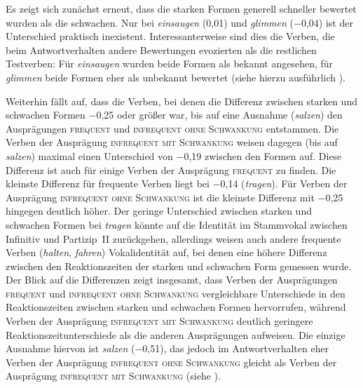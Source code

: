 Es zeigt sich zunächst erneut, dass die starken Formen generell schneller bewertet wurden als die schwachen. Nur bei \textit{einsaugen} (0,01) und \textit{glimmen} (−0,04) ist der Unterschied praktisch inexistent. Interessanterweise sind dies die Verben, die beim Antwortverhalten andere Bewertungen evozierten als die restlichen Testverben: Für \textit{einsaugen} wurden beide Formen als bekannt angesehen, für \textit{glimmen} beide Formen eher als unbekannt bewertet (siehe hierzu ausführlich ).


Weiterhin fällt auf, dass die Verben, bei denen die Differenz zwischen starken und schwachen Formen −0,25 oder größer war, bis auf eine Ausnahme (\textit{salzen}) den Ausprägungen \textsc{frequent} und \textsc{infrequent ohne Schwankung} entstammen. Die Verben der Ausprägung \textsc{infrequent mit Schwankung} weisen dagegen (bis auf \textit{salzen}) maximal einen Unterschied von −0,19 zwischen den Formen auf. Diese Differenz ist auch für einige  Verben der Ausprägung \textsc{frequent} zu finden. Die kleinste Differenz für frequente Verben liegt bei −0,14 (\textit{tragen}). Für Verben der Ausprägung \textsc{infrequent ohne Schwankung} ist die kleinste Differenz  mit −0,25 hingegen deutlich höher. Der geringe Unterschied zwischen starken und schwachen Formen bei \textit{tragen} könnte auf die Identität im Stammvokal zwischen Infinitiv und Partizip~II zurückgehen, allerdings weisen auch andere frequente Verben (\textit{halten}, \textit{fahren}) Vokalidentität auf, bei denen eine höhere Differenz zwischen den Reaktionszeiten der starken und schwachen Form gemessen wurde. Der Blick auf die Differenzen zeigt insgesamt, dass Verben der Ausprägungen \textsc{frequent} und \textsc{infrequent ohne Schwankung} vergleichbare Unterschiede in den Reaktionszeiten zwischen starken und schwachen Formen hervorrufen, während Verben der Ausprägung \textsc{infrequent mit Schwankung} deutlich geringere Reaktionszeitunterschiede als die anderen Ausprägungen aufweisen. Die einzige Ausnahme hiervon ist \textit{salzen} (−0,51), das jedoch im Antwortverhalten eher Verben der Ausprägung \textsc{infrequent ohne Schwankung} gleicht als Verben der Ausprägung \textsc{infrequent mit Schwankung} (siehe ).


